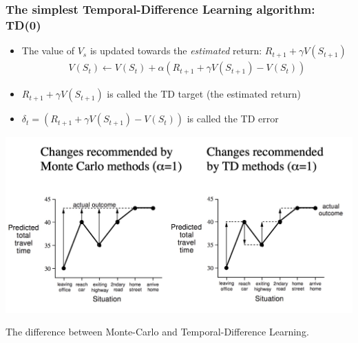 \documentclass[10pt]{article}
\begin{document}
\subsubsection*{The simplest Temporal-Difference Learning algorithm: TD(0)}
\begin{itemize}
\item The value of $V_{s}$ is updated towards the \textit{estimated} return: $R_{t+1}+\gamma V(S_{t+1})$
\begin{align*}
V(S_{t}) \leftarrow V(S_{t}) + \alpha (R_{t+1}+\gamma V(S_{t+1}) - V(S_{t}))
\end{align*}
\item $R_{t+1}+\gamma V(S_{t+1})$     is called the TD target (the estimated return)
\item $\delta_{t} = (R_{t+1}+\gamma V(S_{t+1}) - V(S_{t}))$     is called the TD error
\end{itemize}

\includegraphics[scale=0.3]{pictures/mc_td.jpg}
\caption{The difference between Monte-Carlo and Temporal-Difference Learning.}
\label{img:mc_td}
\end{document}
